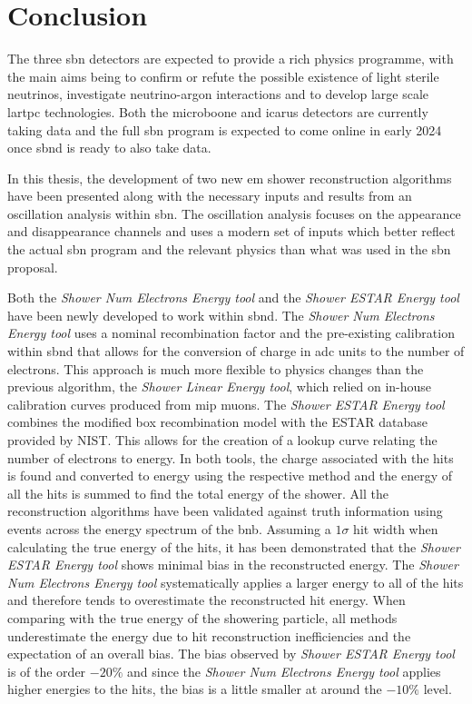 \chapter{Conclusion}
\label{chap:Conclusion}

The three \gls{sbn} detectors are expected to provide a rich physics programme, with the main aims being to confirm or refute the possible existence of light sterile neutrinos, investigate neutrino-argon interactions and to develop large scale \gls{lartpc} technologies. Both the \gls{microboone} and \gls{icarus} detectors are currently taking data and the full \gls{sbn} program is expected to come online in early 2024 once \gls{sbnd} is ready to also take data. 

In this thesis, the development of two new \gls{em} shower reconstruction algorithms have been presented along with the necessary inputs and results from an oscillation analysis within \gls{sbn}. The oscillation analysis focuses on the \nue appearance and disappearance channels and uses a modern set of inputs which better reflect the actual \gls{sbn} program and the relevant physics than what was used in the \gls{sbn} proposal.

Both the \textit{Shower Num Electrons Energy tool} and the \textit{Shower ESTAR Energy tool} have been newly developed to work within \gls{sbnd}. The \textit{Shower Num Electrons Energy tool} uses a nominal recombination factor and the pre-existing calibration within \gls{sbnd} that allows for the conversion of charge in \gls{adc} units to the number of electrons. This approach is much more flexible to physics changes than the previous algorithm, the \textit{Shower Linear Energy tool}, which relied on in-house calibration curves produced from \gls{mip} muons. The \textit{Shower ESTAR Energy tool} combines the modified box recombination model with the ESTAR database provided by NIST. This allows for the creation of a lookup curve relating the number of electrons to energy. In both tools, the charge associated with the hits is found and converted to energy using the respective method and the energy of all the hits is summed to find the total energy of the shower. All the reconstruction algorithms have been validated against truth information using events across the energy spectrum of the \gls{bnb}. Assuming a $1\sigma$ hit width when calculating the true energy of the hits, it has been demonstrated that the \textit{Shower ESTAR Energy tool} shows minimal bias in the reconstructed energy. The \textit{Shower Num Electrons Energy tool} systematically applies a larger energy to all of the hits and therefore tends to overestimate the reconstructed hit energy. When comparing with the true energy of the showering particle, all methods underestimate the energy due to hit reconstruction inefficiencies and the expectation of an overall bias. The bias observed by \textit{Shower ESTAR Energy tool} is of the order $-20\%$ and since the \textit{Shower Num Electrons Energy tool} applies higher energies to the hits, the bias is a little smaller at around the $-10\%$ level.

